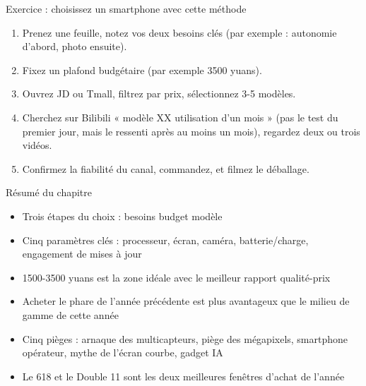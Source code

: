 \begin{tcbpractice}{Exercice : choisissez un smartphone avec cette méthode}
\begin{enumerate}
  \item Prenez une feuille, notez vos deux besoins clés (par exemple : autonomie d'abord, photo ensuite).
  \item Fixez un plafond budgétaire (par exemple 3500 yuans).
  \item Ouvrez JD ou Tmall, filtrez par prix, sélectionnez 3-5 modèles.
  \item Cherchez sur Bilibili « modèle XX utilisation d'un mois » (pas le test du premier jour, mais le ressenti après au moins un mois), regardez deux ou trois vidéos.
  \item Confirmez la fiabilité du canal, commandez, et filmez le déballage.
\end{enumerate}

\end{tcbpractice}

\begin{tcbsummary}{Résumé du chapitre}
\begin{itemize}
  \item Trois étapes du choix : besoins budget modèle
  \item Cinq paramètres clés : processeur, écran, caméra, batterie/charge, engagement de mises à jour
  \item 1500-3500 yuans est la zone idéale avec le meilleur rapport qualité-prix
  \item Acheter le phare de l'année précédente est plus avantageux que le milieu de gamme de cette année
  \item Cinq pièges : arnaque des multicapteurs, piège des mégapixels, smartphone opérateur, mythe de l'écran courbe, gadget IA
  \item Le 618 et le Double 11 sont les deux meilleures fenêtres d'achat de l'année
\end{itemize}

\end{tcbsummary}
